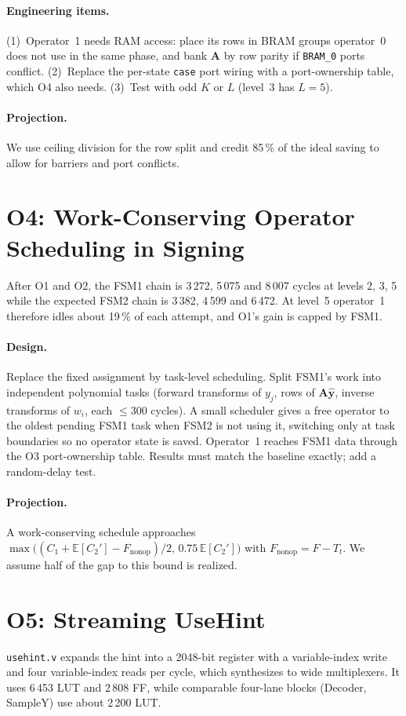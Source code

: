 \documentclass[12pt,a4paper]{report}
\newcommand{\code}[1]{\texttt{#1}}
\begin{document}
\paragraph{Engineering items.}
(1)~Operator~1 needs RAM access: place its rows in BRAM groups operator~0 does not use in the same phase, and bank $\mathbf{A}$ by row parity if \code{BRAM\_0} ports conflict. (2)~Replace the per-state \code{case} port wiring with a port-ownership table, which O4 also needs. (3)~Test with odd $K$ or $L$ (level~3 has $L=5$).

\paragraph{Projection.}
We use ceiling division for the row split and credit 85\,\% of the ideal saving to allow for barriers and port conflicts.

\section{O4: Work-Conserving Operator Scheduling in Signing}
After O1 and O2, the FSM1 chain is 3\,272, 5\,075 and 8\,007 cycles at levels 2, 3, 5 while the expected FSM2 chain is 3\,382, 4\,599 and 6\,472. At level~5 operator~1 therefore idles about 19\,\% of each attempt, and O1's gain is capped by FSM1.

\paragraph{Design.}
Replace the fixed assignment by task-level scheduling. Split FSM1's work into independent polynomial tasks (forward transforms of $y_j$, rows of $\mathbf{A}\hat{\mathbf{y}}$, inverse transforms of $w_i$, each $\le$300 cycles). A small scheduler gives a free operator to the oldest pending FSM1 task when FSM2 is not using it, switching only at task boundaries so no operator state is saved. Operator~1 reaches FSM1 data through the O3 port-ownership table. Results must match the baseline exactly; add a random-delay test.

\paragraph{Projection.}
A work-conserving schedule approaches $\max\big((C_1+\mathbb{E}[C_2']-F_{\text{nonop}})/2,\,0.75\,\mathbb{E}[C_2']\big)$ with $F_{\text{nonop}}=F-T_t$. We assume half of the gap to this bound is realized.

\section{O5: Streaming UseHint}
\code{usehint.v} expands the hint into a 2048-bit register with a variable-index write and four variable-index reads per cycle, which synthesizes to wide multiplexers. It uses 6\,453 LUT and 2\,808 FF, while comparable four-lane blocks (Decoder, SampleY) use about 2\,200 LUT.
\end{document}
